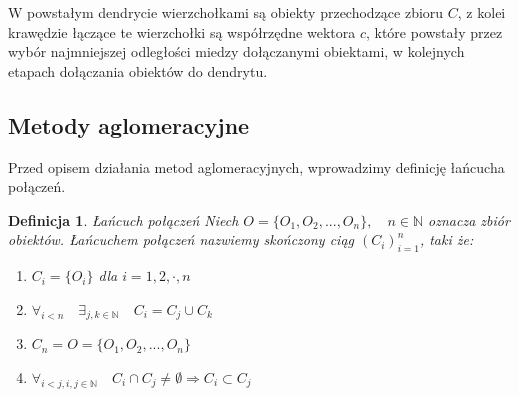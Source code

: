 \documentclass[12pt,a4paper]{report}
\newtheorem{definition}[theorem]{Definicja}
\begin{document}
W powstałym dendrycie wierzchołkami są obiekty przechodzące zbioru $C$, z kolei krawędzie łączące te wierzchołki są współrzędne wektora $c$, które powstały przez wybór najmniejszej odległości miedzy dołączanymi obiektami, w kolejnych etapach dołączania obiektów do dendrytu. 

\subsection{Metody aglomeracyjne}

Przed opisem działania metod aglomeracyjnych, wprowadzimy definicję łańcucha połączeń.

\begin{definition}{Łańcuch połączeń}
Niech $O=\{O_{1},O_{2},..., O_{n}\}, \quad n\in \mathbb{N}$ oznacza zbiór obiektów. Łańcuchem połączeń nazwiemy skończony ciąg $(C_{i})_{i=1}^{n}$, taki że:
\begin{enumerate}
\item $C_{i}=\{O_{i}\}$ dla $i=1, 2, \cdot, n$
\item $\forall_{i<n} \quad \exists_{j,k \in \mathbb{N}} \quad C_{i}=C_{j} \cup C_{k}$
\item $C_{n}=O=\{O_{1},O_{2},..., O_{n}\}$
\item $\forall_{i<j,  {i,j \in \mathbb{N}}} \quad C_{i} \cap C_{j} \neq \emptyset \Rightarrow  C_{i} \subset C_{j}$ 
\end{enumerate}
\end{definition}
\end{document}
